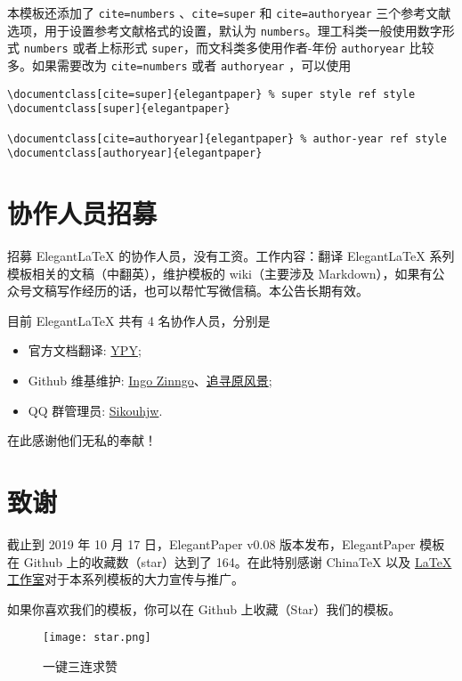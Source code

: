 \documentclass[lang=cn,11pt,a4paper]{elegantpaper}
\begin{document}
本模板还添加了 \lstinline{cite=numbers} 、\lstinline{cite=super} 和 \lstinline{cite=authoryear}  三个参考文献选项，用于设置参考文献格式的设置，默认为 \lstinline{numbers}。理工科类一般使用数字形式 \lstinline{numbers} 或者上标形式 \lstinline{super}，而文科类多使用作者-年份 \lstinline{authoryear} 比较多。如果需要改为 \lstinline{cite=numbers}  或者  \lstinline{authoryear} ，可以使用
\begin{lstlisting}
\documentclass[cite=super]{elegantpaper} % super style ref style
\documentclass[super]{elegantpaper}

\documentclass[cite=authoryear]{elegantpaper} % author-year ref style
\documentclass[authoryear]{elegantpaper}
\end{lstlisting}


\section{协作人员招募}
招募 Elegant\LaTeX{} 的协作人员，没有工资。工作内容：翻译 Elegant\LaTeX{} 系列模板相关的文稿（中翻英），维护模板的 wiki（主要涉及 Markdown），如果有公众号文稿写作经历的话，也可以帮忙写微信稿。本公告长期有效。

目前 ElegantLaTeX 共有 4 名协作人员，分别是
\begin{itemize}
  \item 官方文档翻译: \href{https://github.com/peggy2006xzyz}{YPY};
  \item Github 维基维护: \href{https://github.com/izinngo}{Ingo Zinngo}、\href{https://github.com/xiaohao890809}{追寻原风景};
  \item QQ 群管理员: \href{https://github.com/sikouhjw}{Sikouhjw}.
\end{itemize}

在此感谢他们无私的奉献！


\section{致谢}
截止到 2019 年 10 月 17 日，ElegantPaper v0.08 版本发布，ElegantPaper 模板在 Github 上的收藏数（star）达到了 164。在此特别感谢 China\TeX{} 以及 \href{http://www.latexstudio.net/}{\LaTeX{} 工作室}对于本系列模板的大力宣传与推广。

如果你喜欢我们的模板，你可以在 Github 上收藏（Star）我们的模板。
\begin{figure}[htbp]
  \centering
  \texttt{[image: star.png]}
  \caption{一键三连求赞}
\end{figure}
\end{document}
